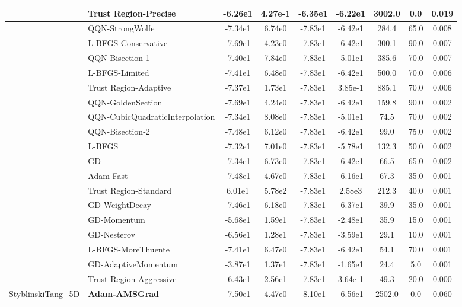\documentclass[10pt]{article}
\begin{document}
\begin{longtable}{|l|l|c|c|c|c|c|c|c|}
\hline
 & Trust Region-Precise & -6.26e1 & 4.27e-1 & -6.35e1 & -6.22e1 & 3002.0 & 0.0 & 0.019 \\
\hline
 & QQN-StrongWolfe & -7.34e1 & 6.74e0 & -7.83e1 & -6.42e1 & 284.4 & 65.0 & 0.008 \\
\hline
 & L-BFGS-Conservative & -7.69e1 & 4.23e0 & -7.83e1 & -6.42e1 & 300.1 & 90.0 & 0.007 \\
\hline
 & QQN-Bisection-1 & -7.40e1 & 7.84e0 & -7.83e1 & -5.01e1 & 385.6 & 70.0 & 0.007 \\
\hline
 & L-BFGS-Limited & -7.41e1 & 6.48e0 & -7.83e1 & -6.42e1 & 500.0 & 70.0 & 0.006 \\
\hline
 & Trust Region-Adaptive & -7.37e1 & 1.73e1 & -7.83e1 & 3.85e-1 & 885.1 & 70.0 & 0.006 \\
\hline
 & QQN-GoldenSection & -7.69e1 & 4.24e0 & -7.83e1 & -6.42e1 & 159.8 & 90.0 & 0.002 \\
\hline
 & QQN-CubicQuadraticInterpolation & -7.34e1 & 8.08e0 & -7.83e1 & -5.01e1 & 74.5 & 70.0 & 0.002 \\
\hline
 & QQN-Bisection-2 & -7.48e1 & 6.12e0 & -7.83e1 & -6.42e1 & 99.0 & 75.0 & 0.002 \\
\hline
 & L-BFGS & -7.32e1 & 7.01e0 & -7.83e1 & -5.78e1 & 132.3 & 50.0 & 0.002 \\
\hline
 & GD & -7.34e1 & 6.73e0 & -7.83e1 & -6.42e1 & 66.5 & 65.0 & 0.002 \\
\hline
 & Adam-Fast & -7.48e1 & 4.67e0 & -7.83e1 & -6.16e1 & 67.3 & 35.0 & 0.001 \\
\hline
 & Trust Region-Standard & 6.01e1 & 5.78e2 & -7.83e1 & 2.58e3 & 212.3 & 40.0 & 0.001 \\
\hline
 & GD-WeightDecay & -7.46e1 & 6.18e0 & -7.83e1 & -6.37e1 & 39.9 & 35.0 & 0.001 \\
\hline
 & GD-Momentum & -5.68e1 & 1.59e1 & -7.83e1 & -2.48e1 & 35.9 & 15.0 & 0.001 \\
\hline
 & GD-Nesterov & -6.56e1 & 1.28e1 & -7.83e1 & -3.59e1 & 29.1 & 10.0 & 0.001 \\
\hline
 & L-BFGS-MoreThuente & -7.41e1 & 6.47e0 & -7.83e1 & -6.42e1 & 54.1 & 70.0 & 0.001 \\
\hline
 & GD-AdaptiveMomentum & -3.87e1 & 1.37e1 & -7.83e1 & -1.65e1 & 24.4 & 5.0 & 0.001 \\
\hline
 & Trust Region-Aggressive & -6.43e1 & 2.56e1 & -7.83e1 & 3.64e-1 & 49.3 & 20.0 & 0.000 \\
StyblinskiTang\_5D & \textbf{Adam-AMSGrad} & -7.50e1 & 4.47e0 & -8.10e1 & -6.56e1 & 2502.0 & 0.0 & 0.060 \\

\end{longtable}
\end{document}
